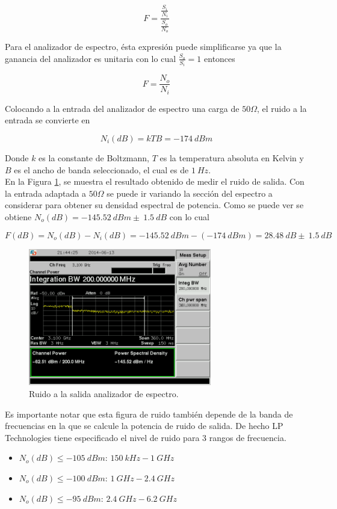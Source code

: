 \documentclass[a4paper,10pt]{article}
\begin{document}
		$$F=\frac{\frac{S_i}{N_i}}{\frac{S_o}{N_o}}$$
		
		\indent Para el analizador de espectro, \'esta expresi\'on puede 
		simplificarse ya que la ganancia del analizador es unitaria con lo cual 
		$\frac{S_o}{S_i}=1$ entonces
		
		$$F=\frac{N_o}{N_i}$$
		
		\indent Colocando a la entrada del analizador de espectro una carga de 
		$50\Omega$, el ruido a la entrada se convierte en 

		$$N_i(dB)=kTB=-174~dBm$$
		
		\indent Donde $k$ es la constante de Boltzmann, $T$ es la temperatura 
		absoluta en Kelvin y $B$ es el ancho de banda seleccionado, el cual es de $1~Hz$. \\
		\indent En la Figura \ref{noise}, se muestra el resultado obtenido de 
		medir el ruido de salida. Con la entrada adaptada a $50\Omega$ se puede 
		ir variando la secci\'on del espectro a considerar para obtener su 
		densidad espectral de potencia. Como se puede ver se obtiene 
		$N_o(dB)=-145.52~dBm\pm~1.5~dB$ con lo cual
		
		$$F(dB)=N_o(dB)-N_i(dB)=-145.52~dBm-(-174~dBm)=28.48~dB\pm~1.5~dB$$
		
		\begin{figure}[!htb]
				\centering
				\includegraphics[width=8cm]
				{Imagenes/SCREN464.png}
				\caption{Ruido a la salida  analizador de espectro.}
				\label{noise} 
		\end{figure}
		
		\indent Es importante notar que esta figura de ruido tambi\'en depende 
		de la banda de frecuencias en la que se calcule la potencia de ruido de 
		salida. De hecho LP Technologies tiene especificado el nivel de ruido 
		para 3 rangos de frecuencia.
		
		\begin{itemize}
			\item $N_o(dB)\leq-105~dBm$: 	$150~kHz-1~GHz$
			\item $N_o(dB)\leq-100~dBm$:	 $1~GHz-2.4~GHz$
			\item $N_o(dB)\leq-95~dBm$:	 $2.4~GHz-6.2~GHz$
		\end{itemize}
		
\end{document}
